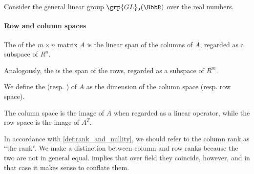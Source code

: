 \begin{example}\label{ex:gl2_generators}
  Consider the \hyperref[def:linear_groups]{general linear group} \( \grp{GL}_2(\BbbR) \) over the \hyperref[def:real_numbers]{real numbers}.
\end{example}

\paragraph{Row and column spaces}

\begin{definition}\label{def:column_and_row_spaces}
  The  of the \( m \times n \) matrix \( A \) is the \hyperref[def:module/subobject]{linear span} of the columns of \( A \), regarded as a subspace of \( R^n \).

  Analogously, the  is the span of the rows, regarded as a subspace of \( R^m \).

  We define the  (resp. ) of \( A \) as the dimension of the column space (resp. row space).
\end{definition}
\begin{comments}
  \item The column space is the image of \( A \) when regarded as a linear operator, while the row space is the image of \( A^T \).

  \item In accordance with \cref{def:rank_and_nullity}, we should refer to the column rank as \enquote{the rank}. We make a distinction between column and row ranks because the two are not in general equal.  implies that over field they coincide, however, and in that case it makes sense to conflate them.
\end{comments}

